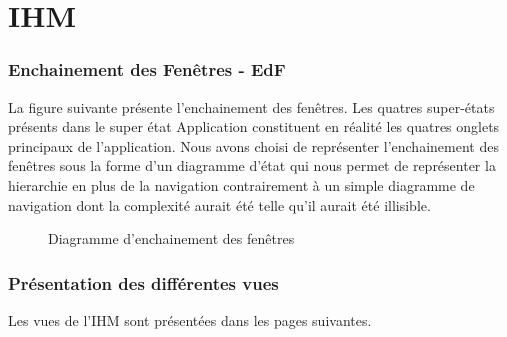 \part{IHM}
\setcounter{section}{0}

\section{Enchainement des Fenêtres - EdF}

La figure suivante présente l'enchainement des fenêtres. Les quatres super-états présents dans le super état Application constituent en réalité les quatres onglets principaux de l'application. Nous avons choisi de représenter l'enchainement des fenêtres sous la forme d'un diagramme d'état qui nous permet de représenter la hierarchie en plus de la navigation contrairement à un simple diagramme de navigation dont la complexité aurait été telle qu'il aurait été illisible.

\begin{figure}[H]
\noindent{}
\caption{Diagramme d'enchainement des fenêtres}
\end{figure}

\section{Présentation des différentes vues}
Les vues de l'IHM sont présentées dans les pages suivantes.

